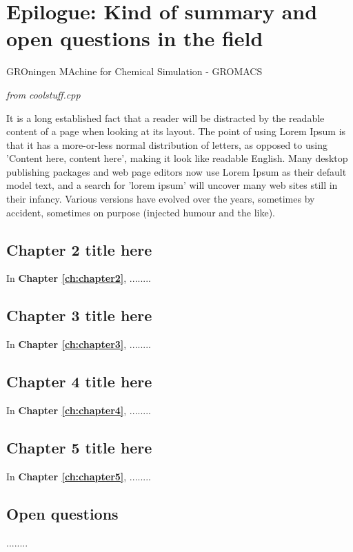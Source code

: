 \chapter{Epilogue: Kind of summary and open questions in the field}
\thispagestyle{noheadrule}
\markboth{}{}
\label{ch:chapter6}
\pgfmathsetmacro\chapclr{\colourarray[6]}
\hypersetup{
  citecolor  = \chapclr,
  linkcolor  = \chapclr,
  urlcolor   = \chapclr,
}

\epigraph{
  GROningen MAchine for Chemical Simulation - GROMACS
}{
  \textit{from coolstuff.cpp} \\
}

\noindent It is a long established fact that a reader will be distracted by the readable content of a page when looking at its layout.
The point of using Lorem Ipsum is that it has a more-or-less normal distribution of letters, as opposed to using 'Content here, content here', making it look like readable English.
Many desktop publishing packages and web page editors now use Lorem Ipsum as their default model text, and a search for 'lorem ipsum' will uncover many web sites still in their infancy.
Various versions have evolved over the years, sometimes by accident, sometimes on purpose (injected humour and the like).


\section{Chapter 2 title here}
In \textbf{Chapter \ref{ch:chapter2}}, ........

\section{Chapter 3 title here}
In \textbf{Chapter \ref{ch:chapter3}}, ........

\section{Chapter 4 title here}
In \textbf{Chapter \ref{ch:chapter4}}, ........

\section{Chapter 5 title here}
In \textbf{Chapter \ref{ch:chapter5}}, ........

\section{Open questions}
........


